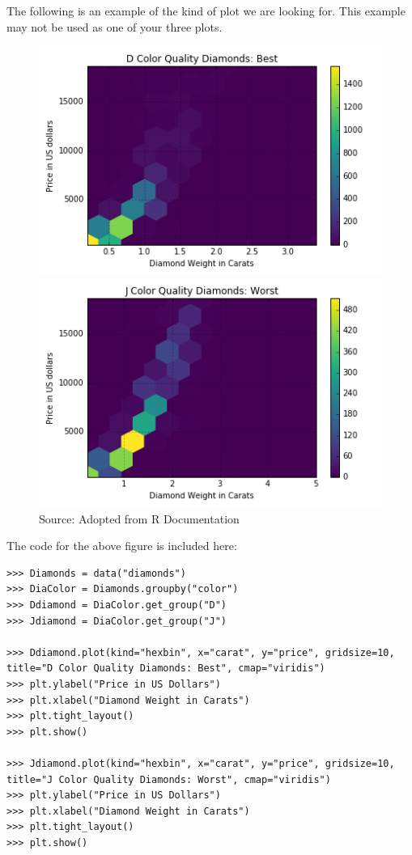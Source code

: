 The following is an example of the kind of plot we are looking for. 
This example may not be used as one of your three plots.
\begin{figure}[H] %
    \centering
    \begin{minipage}[b]{0.48\textwidth}
    \includegraphics[width=\textwidth]{DiamondD.png}
    \end{minipage}
    \quad
    \begin{minipage}[b]{0.48\textwidth}
    \includegraphics[width=\textwidth]{DiamondJ.png}
    \end{minipage}
    \caption{Source: Adopted from R Documentation}
    \label{fig:intro2}
\end{figure}

The code for the above figure is included here:
\begin{lstlisting}
>>> Diamonds = data("diamonds")
>>> DiaColor = Diamonds.groupby("color")
>>> Ddiamond = DiaColor.get_group("D")
>>> Jdiamond = DiaColor.get_group("J")

>>> Ddiamond.plot(kind="hexbin", x="carat", y="price", gridsize=10, title="D Color Quality Diamonds: Best", cmap="viridis")
>>> plt.ylabel("Price in US Dollars")
>>> plt.xlabel("Diamond Weight in Carats")
>>> plt.tight_layout()
>>> plt.show()

>>> Jdiamond.plot(kind="hexbin", x="carat", y="price", gridsize=10, title="J Color Quality Diamonds: Worst", cmap="viridis")
>>> plt.ylabel("Price in US Dollars")
>>> plt.xlabel("Diamond Weight in Carats")
>>> plt.tight_layout()
>>> plt.show()
\end{lstlisting}

